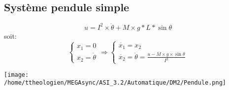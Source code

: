 \documentclass[a4paper,12pt]{article}
\begin{document}
    \subsection{Système pendule simple}
    \label{sub:Système pendule simple}
      \[u = I^2 \times \ddot{\theta} + M \times g * L * \sin{\theta}\]
      soit:
      \[
        \left\{
          \begin{array}{ll}
            x_1 = 0\\
            x_2 = \dot{\theta}
          \end{array}
        \right.
        \Rightarrow
        \left\{
          \begin{array}{ll}
            \dot{x_1} = x_2\\
            \dot{x_2} = \ddot{\theta} = \frac{u - M \times g \times \sin{\theta}}{I^2}
          \end{array}
        \right.
      \]

      \begin{center}
        \texttt{[image: /home/ttheologien/MEGAsync/ASI\_3.2/Automatique/DM2/Pendule.png]}
      \end{center}
\end{document}
